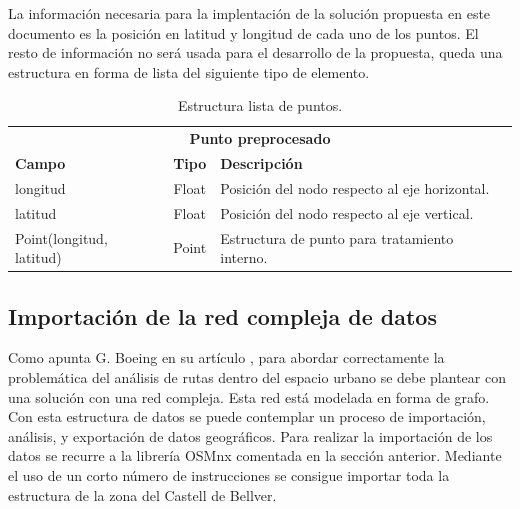 La información necesaria para la implentación de la solución propuesta en este documento es 
la posición en latitud y longitud de cada uno de los puntos. El resto de información no será usada 
para el desarrollo de la propuesta, queda una estructura en forma de lista del siguiente tipo de 
elemento.
\begin{table}[h]
\centering
\begin{tabular}{l | c | l} 
\toprule
\multicolumn{3}{c}{\textbf{Punto preprocesado}} \\ 
\cmidrule(r){1-3}
{\textbf{Campo}} &  {\textbf{Tipo}} & {\textbf{Descripción}} \\
\cmidrule(r){1-3}
{longitud}  & Float & Posición del nodo respecto al eje horizontal. \\
{latitud}  & Float & Posición del nodo respecto al eje vertical.\\
{Point(longitud, latitud)} & Point & Estructura de punto para tratamiento interno. \\
\bottomrule
\end{tabular}
\caption{Estructura lista de puntos.}
\label{TablaNodo}
\end{table}

\subsection{Importación de la red compleja de datos}
\label{section: EstructuraLogica}
Como apunta G. Boeing en su artículo \cite{Boeing01}  , para abordar correctamente la problemática 
del análisis de rutas dentro del espacio urbano se debe plantear con una solución con una red compleja. 
Esta red está modelada en forma de grafo. Con esta estructura de datos se puede contemplar un proceso 
de importación, análisis, y exportación de datos geográficos. Para realizar la importación de los datos se 
recurre a la librería OSMnx comentada en la sección anterior. Mediante el uso de un corto número 
de instrucciones se consigue importar toda la estructura de la zona del Castell de Bellver.

